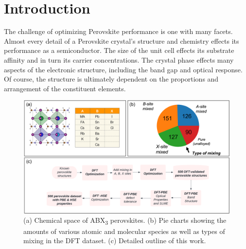 \documentclass[twoside, twocolumn, 9pt, draft]{article}
\begin{document}
\renewcommand*\rmdefault{bch}\normalfont\upshape
\rmfamily
\section*{}
\vspace{-1cm}



\section*{Introduction}
\label{sec:org765d666}
The challenge of optimizing Perovskite performance is one with many
facets. Almost every detail of a Perovskite crystal's structure and
chemistry effects its performance as a semiconductor. The size of the
unit cell effects its substrate affinity and in turn its carrier
concentrations. The crystal phase effects many aspects of the
electronic structure, including the band gap and optical response. Of
course, the structure is ultimately dependent on the proportions and
arrangement of the constituent elements.

\begin{figure}
\centering
\includegraphics[h,width=.9\linewidth]{Figure1.png}
\caption{\label{fig:outline} (a) Chemical space of ABX\textsubscript{3} perovskites. (b) Pie charts showing the amounts of various atomic and molecular species as well as types of mixing in the DFT dataset. (c) Detailed outline of this work.}
\end{figure}
\end{document}
